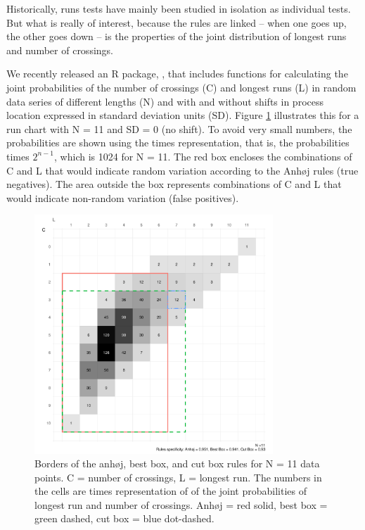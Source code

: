 Historically, runs tests have mainly been studied in isolation as
individual tests. But what is really of interest, because the rules are
linked -- when one goes up, the other goes down -- is the properties of
the joint distribution of longest runs and number of crossings.

We recently released an R package,  \citep{twl2018},
that includes functions for calculating the joint probabilities of the
number of crossings (C) and longest runs (L) in random data series of
different lengths (N) and with and without shifts in process location
expressed in standard deviation units (SD). Figure \ref{figure:box11}
illustrates this for a run chart with N = 11 and SD = 0 (no shift). To
avoid very small numbers, the probabilities are shown using the times
representation, that is, the probabilities times \(2^{n-1}\), which is
1024 for N = 11. The red box encloses the combinations of C and L that
would indicate random variation according to the Anhøj rules (true
negatives). The area outside the box represents combinations of C and L
that would indicate non-random variation (false positives).

\begin{figure}[htbp]
  \centering
  \includegraphics[width=0.8\textwidth]{fig_box11.pdf}
  \caption{Borders of the anhøj, best box, and cut box rules for N = 11 data points. 
           C = number of crossings, L = longest run.
           The numbers in the cells are times representation of of the joint
           probabilities of longest run and number of crossings.
           Anhøj = red solid, best box = green dashed, cut box = blue dot-dashed.}
  \label{figure:box11}
\end{figure}

